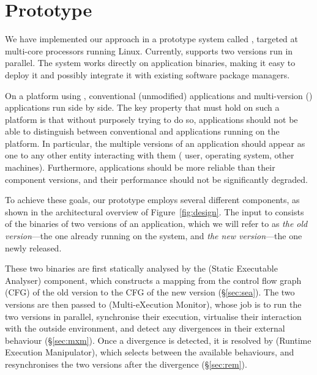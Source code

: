 \section{Prototype}
\label{sec:mx}


We have implemented our approach in a prototype system called \mx, targeted at
multi-core processors running Linux.  Currently, \mx supports two versions run
in parallel. The system works directly on application binaries, making it easy
to deploy it and possibly integrate it with existing software package managers.

On a platform using \mx, conventional (\ie unmodified) applications and
multi-version (\mv) applications run side by side.  The key property that must
hold on such a platform is that without purposely trying to do so, applications
should not be able to distinguish between conventional and \mv applications
running on the platform. In particular, the multiple versions of an \mv
application should appear as one to any other entity interacting with them (\eg
user, operating system, other machines).  Furthermore, \mv applications should
be more reliable than their component versions, and their performance should
not be significantly degraded.

To achieve these goals, our prototype \mx employs several different
components, as shown in the architectural overview of
Figure~\ref{fig:design}.  The input to \mx consists of the binaries of
two versions of an application, which we will refer to as 
\textit{the old version}---the one already running on the system, and 
\textit{the new version}---the one newly released.


These two binaries are first statically analysed by the \sea (Static
Executable Analyser) component, which constructs a mapping from the
control flow graph (CFG) of the old version to the CFG of the new
version (\S\ref{sec:sea}).  The two versions are then passed to \mxm
(Multi-eXecution Monitor), whose job is to run the two versions in
parallel, synchronise their execution, virtualise their interaction
with the outside environment, and detect any divergences in their
external behaviour (\S\ref{sec:mxm}).  Once a divergence is detected,
it is resolved by \rem (Runtime Execution Manipulator), which selects
between the available behaviours, and resynchronises the two versions
after the divergence (\S\ref{sec:rem}).

